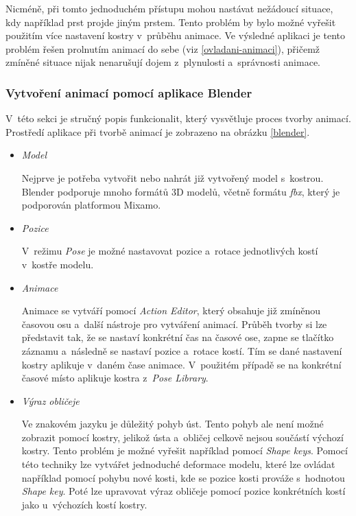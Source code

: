 \documentclass[
  master,
  program=ainfvs,
  biblatex,
  figures=true,
  tables=false,
  sourcecodes=true,
  glossaries,
  index
]{kidiplom}
\begin{document}
            Nicméně, při tomto jednoduchém přístupu mohou nastávat nežádoucí situace, kdy například prst projde jiným prstem. Tento problém by bylo možné vyřešit použitím více nastavení kostry v~průběhu animace. Ve výsledné aplikaci je tento problém řešen prolnutím animací do sebe (viz \ref{ovladani-animaci}), přičemž zmíněné situace nijak nenarušují dojem z~plynulosti a~správnosti animace.
           
        \subsubsection{Vytvoření animací pomocí aplikace Blender}
            V~této sekci je stručný popis funkcionalit, který vysvětluje proces tvorby animací. Prostředí aplikace při tvorbě animací je zobrazeno na obrázku \ref{blender}.

            \begin{itemize}
                    \item \emph{Model} \par
                        Nejprve je potřeba vytvořit nebo nahrát již vytvořený model s~kostrou. Blender podporuje mnoho formátů 3D modelů, včetně formátu \emph{fbx}, který je podporován platformou Mixamo.
                        
                    \item \emph{Pozice} \par
                        V~režimu \emph{Pose} je možné nastavovat pozice a~rotace jednotlivých kostí v~kostře modelu.
                        
                    \item \emph{Animace} \par
                        Animace se vytváří pomocí \emph{Action Editor}, který obsahuje již zmíněnou časovou osu a~další nástroje pro vytváření animací. Průběh tvorby si lze představit tak, že se nastaví konkrétní čas na časové ose, zapne se tlačítko záznamu a~následně se nastaví pozice a~rotace kostí. Tím se dané nastavení kostry aplikuje v~daném čase animace. V~použitém případě se na konkrétní časové místo aplikuje kostra z~\emph{Pose Library}.
                        
                    \item \emph{Výraz obličeje} \par
                        Ve znakovém jazyku je důležitý pohyb úst. Tento pohyb ale není možné zobrazit pomocí kostry, jelikož ústa a~obličej celkově nejsou součástí výchozí kostry. Tento problém je možné vyřešit například pomocí \emph{Shape keys}. Pomocí této techniky lze vytvářet jednoduché deformace modelu, které lze ovládat například pomocí pohybu nové kosti, kde se pozice kosti prováže s~hodnotou \emph{Shape key}. Poté lze upravovat výraz obličeje pomocí pozice konkrétních kostí jako u~výchozích kostí kostry.
                \end{itemize}
\end{document}
